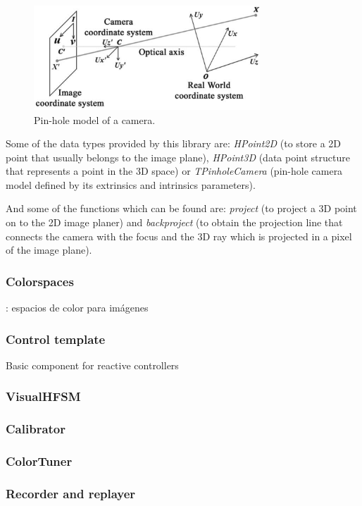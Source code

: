 \documentclass[twocolumn]{svjour3}          %
\begin{document}
\begin{figure}[h!]
  \includegraphics[width=8.5cm]{figs/pinholemodel.png}
\caption{Pin-hole model of a camera.}
\label{fig:pinholemodel}
\end{figure}

Some of the data types provided by this library are: \textit{HPoint2D} (to store a 2D point that usually belongs to the image plane), \textit{HPoint3D} (data point structure that represents a point in the 3D space) or \textit{TPinholeCamera} (pin-hole camera model defined by its extrinsics and intrinsics parameters).

And some of the functions which can be found are: \textit{project} (to project a 3D point on to the 2D image planer) and \textit{backproject} (to obtain the projection line that connects the camera with the focus and the 3D ray which is projected in a pixel of the image plane).

\subsubsection{Colorspaces}: espacios de color para imágenes

\subsubsection{Control template}
Basic component for reactive controllers



\subsubsection{VisualHFSM}
\subsubsection{Calibrator}
\subsubsection{ColorTuner}
\subsubsection{Recorder and replayer}
\end{document}
